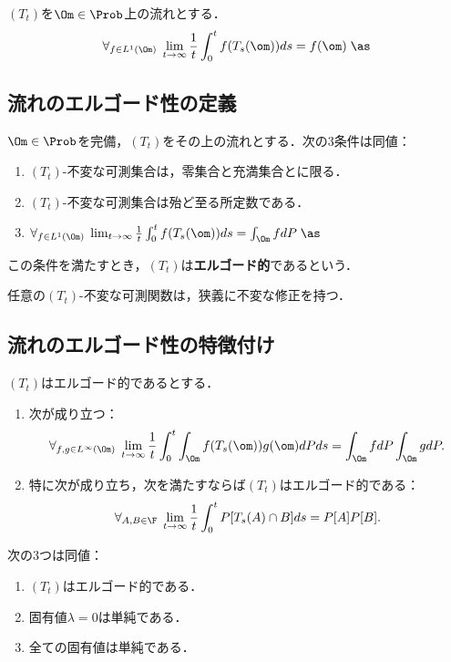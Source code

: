 \documentclass[uplatex,dvipdfmx]{jsreport}
\begin{document}
\begin{theorem}[Wiener]
    $(T_t)$を$\Om\in\Prob$上の流れとする．
    \[\forall_{f\in L^1(\Om)}\;\lim_{t\to\infty}\frac{1}{t}\int^t_0f(T_s(\om))ds=f(\om)\;\as\]
\end{theorem}

\subsection{流れのエルゴード性の定義}

\begin{proposition}
    $\Om\in\Prob$を完備，$(T_t)$をその上の流れとする．次の3条件は同値：
    \begin{enumerate}
        \item $(T_t)$-不変な可測集合は，零集合と充満集合とに限る．
        \item $(T_t)$-不変な可測集合は殆ど至る所定数である．
        \item $\forall_{f\in L^1(\Om)}\;\lim_{t\to\infty}\frac{1}{t}\int^t_0f(T_s(\om))ds=\int_\Om fdP\;\as$
    \end{enumerate}
    この条件を満たすとき，$(T_t)$は\textbf{エルゴード的}であるという．
\end{proposition}

\begin{lemma}
    任意の$(T_t)$-不変な可測関数は，狭義に不変な修正を持つ．
\end{lemma}

\subsection{流れのエルゴード性の特徴付け}

\begin{lemma}[確率測度による特徴付け]
    $(T_t)$はエルゴード的であるとする．
    \begin{enumerate}
        \item 次が成り立つ：
        \[\forall_{f,g\in L^\infty(\Om)}\;\lim_{t\to\infty}\frac{1}{t}\int^t_0\int_\Om f(T_s(\om))g(\om)dPds=\int_\Om fdP\int_\Om gdP.\]
        \item 特に次が成り立ち，次を満たすならば$(T_t)$はエルゴード的である：
        \[\forall_{A,B\in\F}\;\lim_{t\to\infty}\frac{1}{t}\int^t_0P[T_s(A)\cap B]ds=P[A]P[B].\]
    \end{enumerate}
\end{lemma}

\begin{proposition}[エルゴード性のユニタリ作用素群のスペクトルによる特徴付け]
    次の3つは同値：
    \begin{enumerate}
        \item $(T_t)$はエルゴード的である．
        \item 固有値$\lambda=0$は単純である．
        \item 全ての固有値は単純である．
    \end{enumerate}
\end{proposition}
\end{document}
